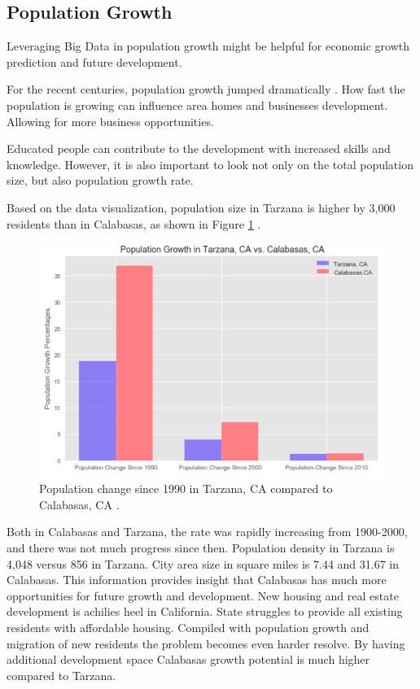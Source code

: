 \documentclass[sigconf]{acmart}
\begin{document}
\subsection{Population Growth}

Leveraging Big Data in population growth might be helpful for economic growth prediction and future development.

For the recent centuries, population growth jumped dramatically \cite{population}. How fast the population is growing can influence area homes and businesses development. Allowing for more business opportunities.   

Educated people can contribute to the development with increased skills and knowledge. However, it is also important to look not only on the total population size, but also population growth rate.

Based on the data visualization, population size in Tarzana is higher by 3,000 residents than in Calabasas, as shown in Figure \ref{fig:figure6} \cite{md}.

\begin{figure}
  \centering
  \includegraphics[width=1.0\columnwidth]{images/figure6.png}
  \caption{Population change since 1990 in Tarzana, CA compared to Calabasas, CA  \cite{md}.} \label{fig:figure6} 
\end{figure}

Both in Calabasas and Tarzana, the rate was rapidly increasing from 1900-2000, and there was not much progress since then. Population density in Tarzana is  4,048 versus 856 in Tarzana. City area size in square miles is 7.44 and 31.67 in Calabasas. 
This information provides insight that Calabasas has much more opportunities for future growth and development. New housing and real estate development is achilies heel in California.  State struggles to provide all existing residents with affordable housing. Compiled with population growth and migration of new residents the problem becomes even harder resolve.  By having additional development space  Calabasas growth potential is much higher compared to Tarzana.
\end{document}
